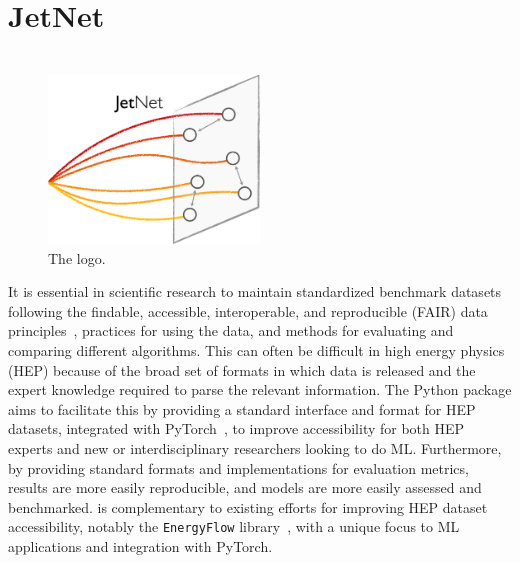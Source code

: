 \ifdefined\HCode
    \section{JetNet}
\else
    \section{\texorpdfstring{\jetnet}{JetNet}}
\fi
\label{sec:06_jetnet_jetnet}

\begin{figure}[ht!]
    \centering
    \captionsetup{justification=centering}
    \includegraphics[width=0.5\textwidth]{figures/06-ML4Jets/jetnetlogo.pdf}
    \caption{The \jetnet logo.}
    \label{fig:06_jetnet_logo}
\end{figure}


It is essential in scientific research to maintain standardized benchmark datasets following the findable, accessible, interoperable, and reproducible (FAIR) data principles~\cite{Chen:2021euv}, practices for using the data, and methods for evaluating and comparing different algorithms.
This can often be difficult in high energy physics (HEP) because of the broad set of formats in which data is released and the expert knowledge required to parse the relevant information.
The \jetnet Python package aims to facilitate this by providing a standard interface and format for HEP datasets, integrated with PyTorch~\cite{NEURIPS2019_9015}, to improve accessibility for both HEP experts and new or interdisciplinary researchers looking to do ML.
Furthermore, by providing standard formats and implementations for evaluation metrics, results are more easily reproducible, and models are more easily assessed and benchmarked.
\jetnet is complementary to existing efforts for improving HEP dataset accessibility, notably the \texttt{EnergyFlow} library~\cite{Komiske:2019jim}, with a unique focus to ML applications and integration with PyTorch.

